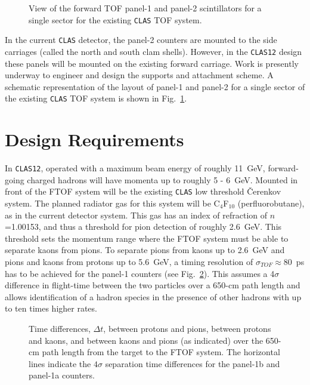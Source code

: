 \begin{figure}[htbp]
\vspace{7.5cm}
\caption{\small{View of the forward TOF panel-1 and panel-2 scintillators
for a single sector for the existing {\tt CLAS} TOF system.}}
\label{panel_layout}
\end{figure}

In the current {\tt CLAS} detector, the panel-2 counters are mounted to the
side carriages (called the north and south clam shells).  However, in
the {\tt CLAS12} design these panels will be mounted on the existing
forward carriage.  Work is presently underway to engineer and design the
supports and attachment scheme.  A schematic representation of the layout 
of panel-1 and panel-2 for a single sector of the existing {\tt CLAS} TOF 
system is shown in Fig.~\ref{panel_layout}.

\section{Design Requirements}
\label{design_req}

In {\tt CLAS12}, operated with a maximum beam energy of roughly 11~GeV,
forward-going charged hadrons will have momenta up to roughly 5 - 6~GeV.  
Mounted in front of the FTOF system will be the existing {\tt CLAS} low 
threshold {\v C}erenkov system.  The planned radiator gas for this system will
be C$_4$F$_{10}$ (perfluorobutane), as in the current detector system.  This 
gas has an index of refraction of $n$=1.00153, and thus a threshold for pion
detection of roughly 2.6~GeV.  This threshold sets the momentum range where
the FTOF system must be able to separate kaons from pions.  To separate pions 
from kaons up to 2.6~GeV and pions and kaons from protons up to 5.6~GeV, a 
timing resolution of $\sigma_{TOF} \approx$80~ps has to be achieved for the 
panel-1 counters (see Fig.~\ref{delta_tof}).  This assumes a 4$\sigma$ 
difference in flight-time between the two particles over a 650-cm path 
length and allows identification of a hadron species in the presence of 
other hadrons with up to ten times higher rates.

\begin{figure}[htbp]
\vspace{7.0cm}
\caption{\small{Time differences, $\Delta t$, between protons and pions,
between protons and kaons, and between kaons and pions (as indicated) over
the 650-cm path length from the target to the FTOF system.  The 
horizontal lines indicate the $4\sigma$ separation time differences for
the panel-1b and panel-1a counters.}}
\label{delta_tof}
\end{figure}

